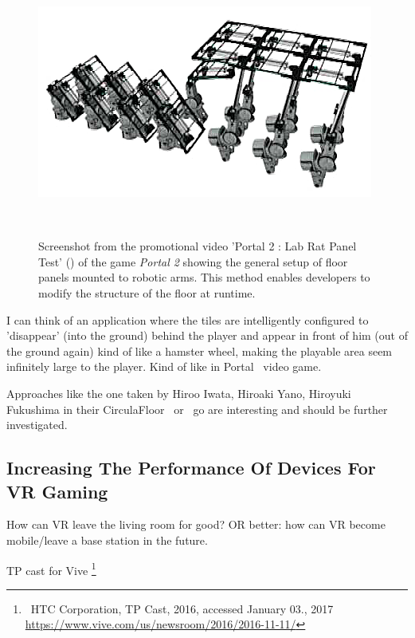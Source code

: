 \begin{figure}
	\centering
	\includegraphics[width=0.9\columnwidth]{./figures/portallabrattest}
	\caption[Portal 2 : Lab Rat Panel Test]{Screenshot from the promotional video 'Portal 2 : Lab Rat Panel Test' (\ccbyncsa) of the game \textit{Portal 2 \textregistered\textcopyright} showing the general setup of floor panels mounted to robotic arms. This method enables developers to modify the structure of the floor at runtime.\footnotemark}~\label{fig:portallabrattest}
\end{figure}

I can think of an application where the tiles are intelligently configured to 'disappear' (into the ground) behind the player and appear in front of him (out of the ground again) kind of like a hamster wheel, making the playable area seem infinitely large to the player. Kind of like in Portal~\cite{game:portal} video game.

Approaches like the one taken by Hiroo Iwata, Hiroaki Yano, Hiroyuki Fukushima in their CirculaFloor~\cite{Iwata:2005:CLI:1078037.1079777} or~\cite{Souman:2010:MVW:1670671.1670675} go are interesting and should be further investigated. 


\subsection{Increasing The Performance Of Devices For VR Gaming}
How can VR leave the living room for good? OR better: how can VR become mobile/leave a base station in the future.

TP cast for Vive \footnote{\textcopyright~HTC Corporation, TP Cast, 2016, accessed January 03., 2017 \url{https://www.vive.com/us/newsroom/2016/2016-11-11/}}

